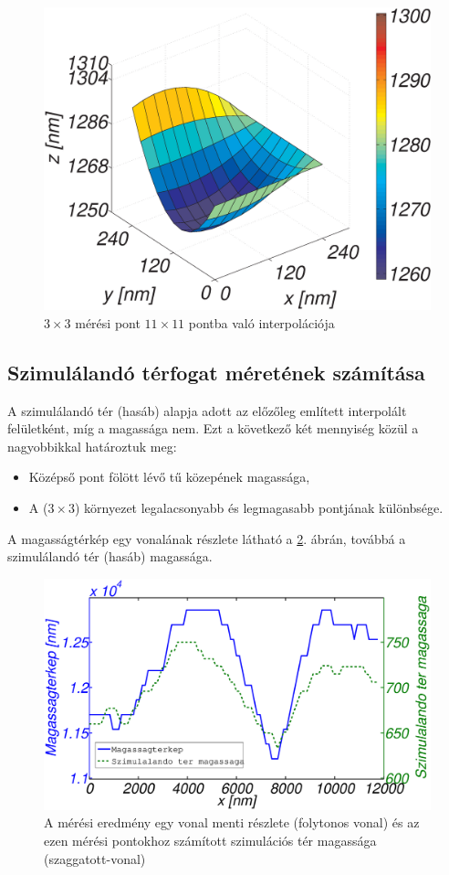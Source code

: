	\begin{figure}[!h]
		\centering
		\includegraphics[width=0.8\columnwidth]{figures/eps/3x3_interpol2.eps}
		\caption{$3\times3$ mérési pont $11\times11$ pontba való interpolációja}
		\label{fig:33pont}
	\end{figure}
	
\subsection{Szimulálandó térfogat méretének számítása}
	A szimulálandó tér (hasáb) alapja adott az előzőleg említett interpolált felületként, míg a
	magassága nem. Ezt a következő két mennyiség közül a nagyobbikkal határoztuk meg:
	\begin{itemize}
		\item Középső pont fölött lévő tű közepének magassága,
		\item A ($3\times3$) környezet legalacsonyabb és legmagasabb pontjának
		különbsége.
	\end{itemize}
	A magasságtérkép egy vonalának részlete látható a \ref{fig:numh}. ábrán, 
	továbbá a szimulálandó tér (hasáb) magassága.
	
	\begin{figure}[!ht]
		\centering
		\includegraphics[width=0.7\columnwidth]{figures/eps/numh_vonal.eps}%
		\caption{A mérési eredmény egy vonal menti részlete (folytonos vonal) és az ezen
		mérési pontokhoz számított szimulációs tér magassága (szaggatott-vonal)}
		\label{fig:numh} 
	\end{figure}

